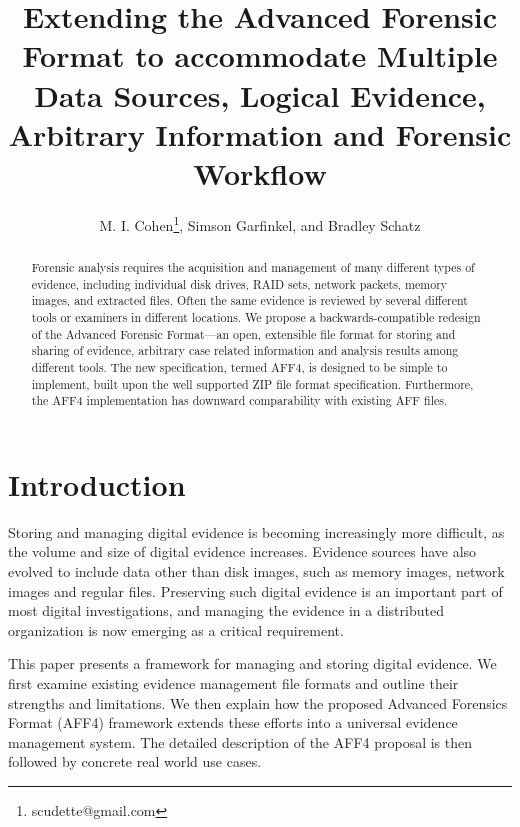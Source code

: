 \documentclass[10pt, conference]{IEEEtran}
\begin{document}
\title{Extending the Advanced Forensic Format to accommodate Multiple
  Data Sources, Logical Evidence, Arbitrary Information and Forensic Workflow}
\author{M. I. Cohen\footnote{scudette@gmail.com}, Simson Garfinkel, and Bradley Schatz}
\maketitle

\begin{abstract}
Forensic analysis requires the acquisition and management of many
different types of evidence, including individual disk drives, RAID
sets, network packets, memory images, and extracted files. Often the
same evidence is reviewed by several different tools or examiners in
different locations. We propose a backwards-compatible redesign of the
Advanced Forensic Format---an open, extensible file format for storing
and sharing of evidence, arbitrary case related information and
analysis results among different tools. The new specification, termed
AFF4, is designed to be simple to implement, built upon the well
supported ZIP file format specification. Furthermore, the AFF4 implementation has
downward comparability with existing AFF files.
\end{abstract}

\section{Introduction}
Storing and managing digital evidence is becoming increasingly more
difficult, as the volume and size of digital evidence increases. Evidence
sources have also evolved to include data
other than disk images, such as memory images, network images and
regular files. Preserving such digital evidence is an important part of
most digital investigations\cite{carrier:event-based}, and managing
the evidence in a distributed organization is now emerging as a
critical requirement.

This paper presents a framework for managing and storing digital
evidence. We first examine existing evidence management file formats
and outline their strengths and limitations. We then explain how the
proposed Advanced Forensics Format (AFF4) framework extends these
efforts into a universal evidence management system. The detailed
description of the AFF4 proposal is then followed by concrete real
world use cases.
\end{document}

